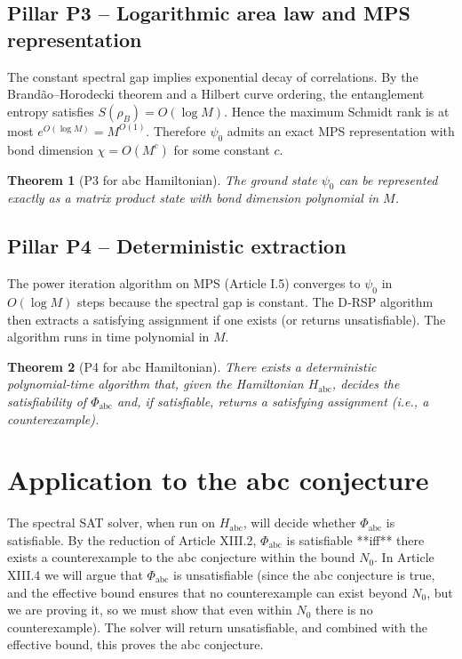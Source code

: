 \documentclass[11pt,a4paper]{article}
\newtheorem{theorem}{Theorem}[section]
\begin{document}
\subsection{Pillar P3 – Logarithmic area law and MPS representation}
The constant spectral gap implies exponential decay of correlations. By the Brandão–Horodecki theorem and a Hilbert curve ordering, the entanglement entropy satisfies $S(\rho_B) = O(\log M)$. Hence the maximum Schmidt rank is at most $e^{O(\log M)} = M^{O(1)}$. Therefore $\psi_0$ admits an exact MPS representation with bond dimension $\chi = O(M^c)$ for some constant $c$.

\begin{theorem}[P3 for abc Hamiltonian]
The ground state $\psi_0$ can be represented exactly as a matrix product state with bond dimension polynomial in $M$.
\end{theorem}

\subsection{Pillar P4 – Deterministic extraction}
The power iteration algorithm on MPS (Article I.5) converges to $\psi_0$ in $O(\log M)$ steps because the spectral gap is constant. The D‑RSP algorithm then extracts a satisfying assignment if one exists (or returns unsatisfiable). The algorithm runs in time polynomial in $M$.

\begin{theorem}[P4 for abc Hamiltonian]
There exists a deterministic polynomial‑time algorithm that, given the Hamiltonian $H_{\text{abc}}$, decides the satisfiability of $\Phi_{\text{abc}}$ and, if satisfiable, returns a satisfying assignment (i.e., a counterexample).
\end{theorem}

\section{Application to the abc conjecture}

The spectral SAT solver, when run on $H_{\text{abc}}$, will decide whether $\Phi_{\text{abc}}$ is satisfiable. By the reduction of Article XIII.2, $\Phi_{\text{abc}}$ is satisfiable **iff** there exists a counterexample to the abc conjecture within the bound $N_0$. In Article XIII.4 we will argue that $\Phi_{\text{abc}}$ is unsatisfiable (since the abc conjecture is true, and the effective bound ensures that no counterexample can exist beyond $N_0$, but we are proving it, so we must show that even within $N_0$ there is no counterexample). The solver will return unsatisfiable, and combined with the effective bound, this proves the abc conjecture.
\end{document}
